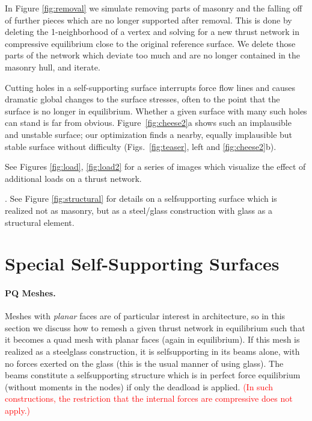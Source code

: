 \documentclass[annual]{acmsiggraph}
\newcommand{\newtext}[1]{\textcolor{red}{#1}}
\begin{document}
In Figure \ref{fig:removal} we simulate removing parts of masonry and
the falling off of further pieces which are no longer supported after
removal.
This is done by deleting the 1-neighborhood of a vertex
and solving for a new thrust network in compressive equilibrium
close to the original reference surface. We delete those parts of the
network which deviate too much and are no longer contained in the masonry
hull, and iterate.



Cutting holes in a self-supporting surface interrupts force flow lines and
causes dramatic global changes to the surface stresses, often to the point
that the surface is no longer in equilibrium. Whether a given surface with
many such holes can stand is far from obvious. Figure~\ref{fig:cheese2}a
shows such an implausible and unstable surface; our optimization finds a
nearby, equally implausible but stable surface without difficulty 
(Figs.~\ref{fig:teaser}, left and \ref{fig:cheese2}b).

 See Figures \ref{fig:load},
\ref{fig:load2} for a series of images which visualize the effect of
additional loads on a thrust network.


. See Figure \ref{fig:structural} for
details on a self\dash supporting surface which is realized
not as masonry, but as a steel\slash glass construction with glass as
a structural element.




\section{Special Self-Supporting Surfaces} \label{sec:special}

\paragraph{PQ Meshes.}

Meshes with {\em planar} faces are of particular interest in architecture,
so in this section we discuss how to remesh a given thrust network in
equilibrium such that it becomes a quad mesh with planar faces (again in
equilibrium). If this mesh is realized as a steel\dash glass construction,
it is self\dash supporting in its beams alone, with no forces exerted on
the glass (this is the usual manner of using glass). The beams constitute
a self\dash supporting structure which is in perfect force equilibrium
(without moments in the nodes) if only the deadload is applied. \newtext{(In such constructions, the restriction that the internal forces are compressive does not apply.)}
\end{document}
